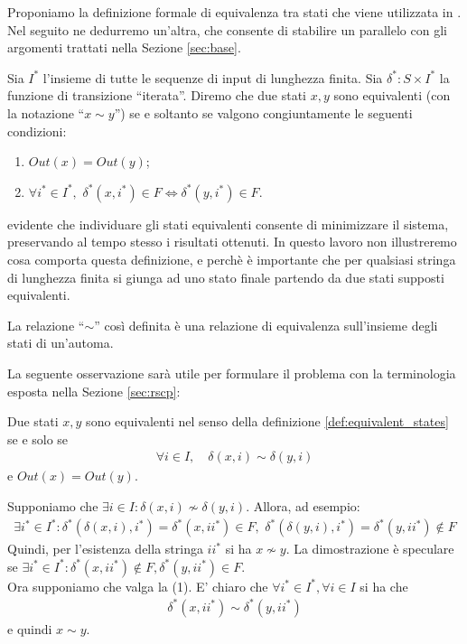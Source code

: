 Proponiamo la definizione formale di equivalenza tra stati che viene utilizzata in \cite{hopcroft}. Nel seguito ne dedurremo un'altra, che consente di stabilire un parallelo con gli argomenti trattati nella Sezione \ref{sec:base}.
\begin{definition}
    \label{def:equivalent_states}
    Sia $I^*$ l'insieme di tutte le sequenze di input di lunghezza finita. Sia $\delta^* : S \times I^*$ la funzione di transizione ``iterata''. Diremo che due stati $x,y$ sono equivalenti (con la notazione ``$x \sim y$'') se e soltanto se valgono congiuntamente le seguenti condizioni:
    \begin{enumerate}
        \item $Out(x) = Out(y)$;
        \item $\forall i^* \in I^*,\,\, \delta^*(x,i^*) \in F \iff \delta^*(y,i^*) \in F$.
    \end{enumerate}
\end{definition}
\accente evidente che individuare gli stati equivalenti consente di minimizzare il sistema, preservando al tempo stesso i risultati ottenuti. In questo lavoro non illustreremo cosa comporta questa definizione, e perchè è importante che per qualsiasi stringa di lunghezza finita si giunga ad uno stato finale partendo da due stati supposti equivalenti.
\begin{observation}
    La relazione ``$\sim$'' così definita è una relazione di equivalenza sull'insieme degli stati di un'automa.
\end{observation}
La seguente osservazione sarà utile per formulare il problema con la terminologia esposta nella Sezione \ref{sec:rscp}:
\begin{observation}
    \label{obs:equivalent_states}
    Due stati $x,y$ sono equivalenti nel senso della definizione \ref{def:equivalent_states} se e solo se
    \begin{gather}
        \forall i \in I, \quad \delta(x,i) \sim \delta(y,i)
    \end{gather}
    e $Out(x) = Out(y)$.
\end{observation}
\begin{proof2}
    Supponiamo che $\exists i \in I : \delta(x,i) \not\sim \delta(y,i)$. Allora, ad esempio:
    \begin{gather*}
        \exists i^* \in I^* : \delta^*(\delta(x,i),i^*) = \delta^*(x,ii^*) \in F, \,\, \delta^*(\delta(y,i),i^*) = \delta^*(y,ii^*) \notin F
    \end{gather*}
    Quindi, per l'esistenza della stringa $ii^*$ si ha $x \not\sim y$. La dimostrazione è speculare se $\exists i^* \in I^* : \delta^*(x,ii^*) \notin F, \delta^*(y,ii^*) \in F$.\\
    Ora supponiamo che valga la (1). E' chiaro che $\forall i^* \in I^*, \forall i \in I$ si ha che
    \begin{gather*}
        \delta^*(x,ii^*) \sim \delta^*(y,ii^*)
    \end{gather*}
    e quindi $x \sim y$.
\end{proof2}
